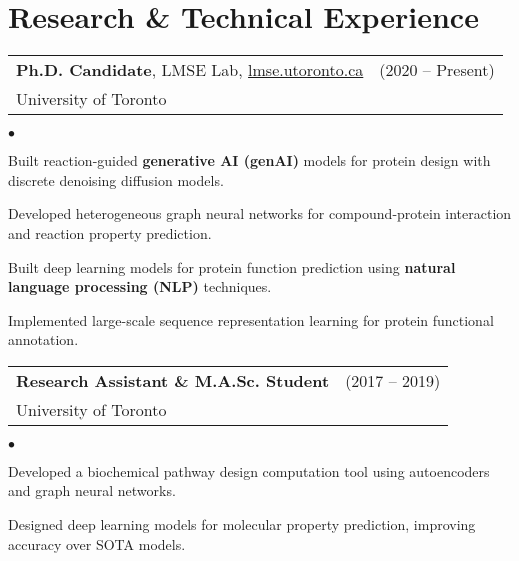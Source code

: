 \documentclass[a4paper,20pt]{article}
\makeatletter
\newcommand{\resumeTechHeading}[4]{%
  \vspace{0pt}%
  \begin{tabular*}{1.00\textwidth}{l@{\extracolsep{\fill}}r}
    #1 & #2 \\
    #3 & \textit{#4} \\
  \end{tabular*}%
  \vspace{1pt}%
}
\newenvironment{resumeTechItems}{%
  \begingroup
  \fontsize{10pt}{12pt}\selectfont   %
  \setlength{\parskip}{0pt}          %
  \setlength{\baselineskip}{12pt}    %
  \begin{list}{$\bullet$}{           %
    \setlength{\leftmargin}{1.3em}   %
    \setlength{\rightmargin}{0.2em}  %
    \setlength{\itemsep}{-2pt}       %
    \setlength{\topsep}{1pt}         %
    \setlength{\parsep}{2pt}         %
  }
}
{
  \end{list}%
  \endgroup %
}
\makeatother
\begin{document}
\vspace{-1pt}
\section{Research \& Technical Experience}


\hypersetup{urlcolor=black}
\resumeTechHeading{\textbf{Ph.D. Candidate}, LMSE Lab, \href{http://lmse.utoronto.ca/}{lmse.utoronto.ca}}{(2020 – Present)}
{University of Toronto}{}

\begin{resumeTechItems}
  \item{Built reaction-guided \textbf{generative AI (genAI)} models for protein design with discrete denoising diffusion models.}
  \item{Developed heterogeneous graph neural networks for compound-protein interaction and reaction property prediction.}
  \item{Built deep learning models for protein function prediction using \textbf{natural language processing (NLP)} techniques.}
  \item{Implemented large-scale sequence representation learning for protein functional annotation.}
\end{resumeTechItems}


\resumeTechHeading{\textbf{Research Assistant \& M.A.Sc. Student}}{(2017 – 2019)}
{University of Toronto}{}

\begin{resumeTechItems}
  \item{Developed a biochemical pathway design computation tool using autoencoders and graph neural networks.}
  \item{Designed deep learning models for molecular property prediction, improving accuracy over SOTA models.}
\end{resumeTechItems}
\end{document}
